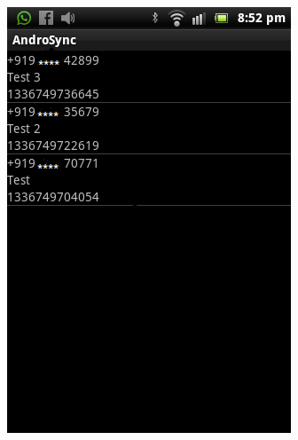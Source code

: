 \newpage
\vspace*{1cm}
\begin{figure}[H]
  \centering
    \includegraphics[scale=0.6]{project/images/AndroSyncClient/andro-client07}
\end{figure}